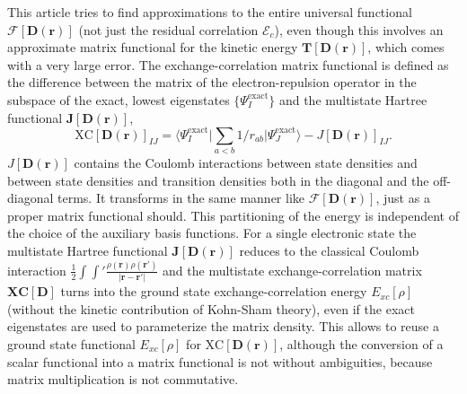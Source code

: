 \documentclass[journal=jpclcd,manuscript=letter]{achemso}
\newcommand\m[1]{\mathbf{#1}}
\renewcommand\vec[1]{\mathbf{#1}}
\begin{document}
This article tries to find approximations to the entire universal functional $\m{\mathcal{F}}[\m{D}(\vec{r})]$
(not just the residual correlation $\m{\mathcal{E}}_c$), even though this involves an approximate
matrix functional for the kinetic energy $\m{T}[\m{D}(\vec{r})]$, which comes with a very large error.
The exchange-correlation matrix functional
is defined as the difference between the matrix of the electron-repulsion operator in the subspace of the exact, lowest eigenstates
$\{\Psi_{I}^{\text{exact}}\}$ and
the multistate Hartree functional $\m{J}[\m{D}(\vec{r})]$,
\begin{equation}
 \text{XC}[\m{D}(\vec{r})]_{IJ} = \langle \Psi_I^{\text{exact}} \vert \sum_{a < b} 1/r_{ab} \vert \Psi_J^{\text{exact}} \rangle - J[\m{D}(\vec{r})]_{IJ}.
\end{equation}
$J[\m{D}(\vec{r})]$ contains the Coulomb interactions between state densities
and between state densities and transition densities both in the diagonal and the off-diagonal terms. It transforms 
in the same manner like $\mathcal{F}[\m{D}(\vec{r})]$, just as a proper matrix functional should.
This partitioning of the energy is independent of the choice of the auxiliary basis functions.
For a single electronic state the multistate Hartree functional $\m{J}[\m{D}(\vec{r})]$ reduces to the classical Coulomb interaction
$\frac{1}{2} \int \int' \frac{\rho(\vec{r}) \rho(\vec{r}')}{\vert \vec{r} - \vec{r}' \vert}$ and the multistate exchange-correlation matrix $\m{\text{XC}}[\m{D}]$
turns into the ground state exchange-correlation energy $E_{xc}[\rho]$ (without the kinetic contribution of Kohn-Sham theory),
even if the exact eigenstates are used to parameterize the matrix density.
This allows to reuse a ground state functional $E_{xc}[\rho]$ for $\text{XC}[\m{D}(\vec{r})]$, although the conversion of
a scalar functional into a matrix functional is not without ambiguities, because matrix multiplication is not commutative.
\end{document}
